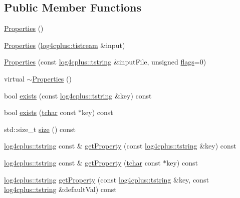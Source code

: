 \subsection*{Public Member Functions}
\begin{DoxyCompactItemize}
\item 
\hyperlink{classlog4cplus_1_1helpers_1_1Properties_aae05c822779b780b844d5f0ff32b017b}{Properties} ()
\item 
\hyperlink{classlog4cplus_1_1helpers_1_1Properties_a82babb86039af8233a7d6cd21de4348f}{Properties} (\hyperlink{namespacelog4cplus_aa09fa8d7ec3f48e80ed15d5a1dbc38a7}{log4cplus\-::tistream} \&input)
\item 
\hyperlink{classlog4cplus_1_1helpers_1_1Properties_aca1c1dd5c5de7520e61f0d2ccbf30291}{Properties} (const \hyperlink{namespacelog4cplus_a3c9287f6ebcddc50355e29d71152117b}{log4cplus\-::tstring} \&input\-File, unsigned \hyperlink{classlog4cplus_1_1helpers_1_1Properties_a421e8c2c017bceb1f21d3811a9839b00}{flags}=0)
\item 
virtual \hyperlink{classlog4cplus_1_1helpers_1_1Properties_a93d5aac3769b10c9ea740b2c5c215d8d}{$\sim$\-Properties} ()
\item 
bool \hyperlink{classlog4cplus_1_1helpers_1_1Properties_a606da4f9114d4d087312fc78feb674a9}{exists} (const \hyperlink{namespacelog4cplus_a3c9287f6ebcddc50355e29d71152117b}{log4cplus\-::tstring} \&key) const 
\item 
bool \hyperlink{classlog4cplus_1_1helpers_1_1Properties_aefa7bf7a435bed2d88044ea0cfadf1c0}{exists} (\hyperlink{namespacelog4cplus_a7b80b5711ae9e7a1ddd97dbaefbe3583}{tchar} const $\ast$key) const 
\item 
std\-::size\-\_\-t \hyperlink{classlog4cplus_1_1helpers_1_1Properties_ad8582a3c2dedabd6de88efc5c58e4a89}{size} () const 
\item 
\hyperlink{namespacelog4cplus_a3c9287f6ebcddc50355e29d71152117b}{log4cplus\-::tstring} const \& \hyperlink{classlog4cplus_1_1helpers_1_1Properties_a72a8744530f061cffaa3937e4006bb91}{get\-Property} (const \hyperlink{namespacelog4cplus_a3c9287f6ebcddc50355e29d71152117b}{log4cplus\-::tstring} \&key) const 
\item 
\hyperlink{namespacelog4cplus_a3c9287f6ebcddc50355e29d71152117b}{log4cplus\-::tstring} const \& \hyperlink{classlog4cplus_1_1helpers_1_1Properties_a939be84d862a99f845966c417cfc8936}{get\-Property} (\hyperlink{namespacelog4cplus_a7b80b5711ae9e7a1ddd97dbaefbe3583}{tchar} const $\ast$key) const 
\item 
\hyperlink{namespacelog4cplus_a3c9287f6ebcddc50355e29d71152117b}{log4cplus\-::tstring} \hyperlink{classlog4cplus_1_1helpers_1_1Properties_a5af98b2a8728940092786703f98c9f1d}{get\-Property} (const \hyperlink{namespacelog4cplus_a3c9287f6ebcddc50355e29d71152117b}{log4cplus\-::tstring} \&key, const \hyperlink{namespacelog4cplus_a3c9287f6ebcddc50355e29d71152117b}{log4cplus\-::tstring} \&default\-Val) const 

\end{DoxyCompactItemize}
